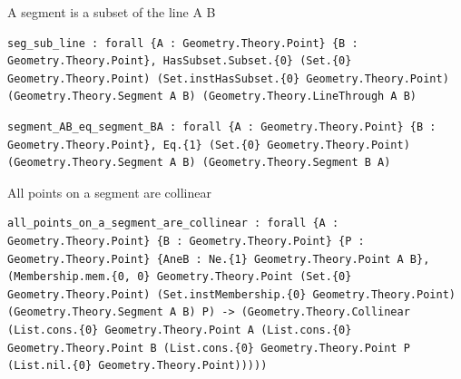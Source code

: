 \begin{theorem}
  \label{Geometry.Theory.Line.seg_sub_line}
  \leanok
  A segment is a subset of the line A B 
\begin{verbatim}seg_sub_line : forall {A : Geometry.Theory.Point} {B : Geometry.Theory.Point}, HasSubset.Subset.{0} (Set.{0} Geometry.Theory.Point) (Set.instHasSubset.{0} Geometry.Theory.Point) (Geometry.Theory.Segment A B) (Geometry.Theory.LineThrough A B)\end{verbatim}
\end{theorem}

\begin{theorem}
  \label{Geometry.Theory.Line.segment_AB_eq_segment_BA}
  \leanok
\begin{verbatim}segment_AB_eq_segment_BA : forall {A : Geometry.Theory.Point} {B : Geometry.Theory.Point}, Eq.{1} (Set.{0} Geometry.Theory.Point) (Geometry.Theory.Segment A B) (Geometry.Theory.Segment B A)\end{verbatim}
\end{theorem}

\begin{theorem}
  \label{Geometry.Theory.Line.all_points_on_a_segment_are_collinear}
  \leanok
  All points on a segment are collinear 
\begin{verbatim}all_points_on_a_segment_are_collinear : forall {A : Geometry.Theory.Point} {B : Geometry.Theory.Point} {P : Geometry.Theory.Point} {AneB : Ne.{1} Geometry.Theory.Point A B}, (Membership.mem.{0, 0} Geometry.Theory.Point (Set.{0} Geometry.Theory.Point) (Set.instMembership.{0} Geometry.Theory.Point) (Geometry.Theory.Segment A B) P) -> (Geometry.Theory.Collinear (List.cons.{0} Geometry.Theory.Point A (List.cons.{0} Geometry.Theory.Point B (List.cons.{0} Geometry.Theory.Point P (List.nil.{0} Geometry.Theory.Point)))))\end{verbatim}
\end{theorem}

